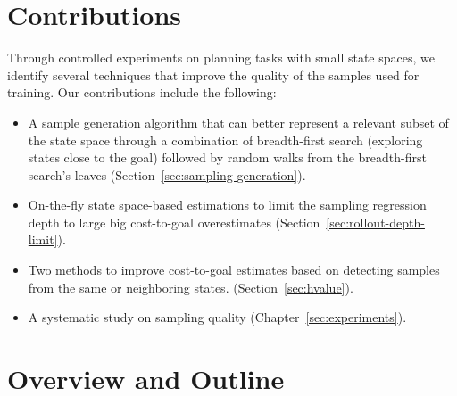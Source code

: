\section{Contributions}
\label{sec:intro_contributions}

Through controlled experiments on planning tasks with small state spaces, we identify several techniques that improve the quality of the samples used for training. Our contributions include the following:

\begin{itemize}
    \item A sample generation algorithm that can better represent a relevant subset of the state space through a combination of breadth-first search (exploring states close to the goal) followed by random walks from the breadth-first search's leaves (Section~\ref{sec:sampling-generation}).
    \item On-the-fly state space-based estimations to limit the sampling regression depth to large big cost-to-goal overestimates (Section~\ref{sec:rollout-depth-limit}).
    \item Two methods to improve cost-to-goal estimates based on detecting samples from the same or neighboring states. (Section~\ref{sec:hvalue}).
    \item A systematic study on sampling quality (Chapter~\ref{sec:experiments}).
\end{itemize}

\section{Overview and Outline}
\label{sec:intro_outline}

